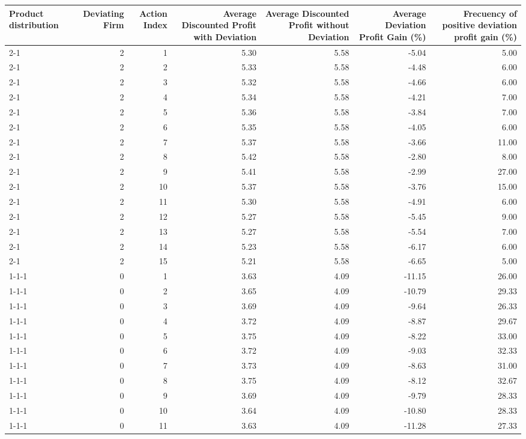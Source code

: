 \begin{tabular}{lrrrrrr}
\toprule
Product distribution & Deviating Firm & Action Index & Average Discounted Profit with Deviation & Average Discounted Profit without Deviation & Average Deviation Profit Gain (\%) & Frecuency of positive deviation profit gain (\%) \\
\midrule
2-1  & 2 & 1 & 5.30 & 5.58 & -5.04 & 5.00 \\
2-1  & 2 & 2 & 5.33 & 5.58 & -4.48 & 6.00 \\
2-1  & 2 & 3 & 5.32 & 5.58 & -4.66 & 6.00 \\
2-1  & 2 & 4 & 5.34 & 5.58 & -4.21 & 7.00 \\
2-1  & 2 & 5 & 5.36 & 5.58 & -3.84 & 7.00 \\
2-1  & 2 & 6 & 5.35 & 5.58 & -4.05 & 6.00 \\
2-1  & 2 & 7 & 5.37 & 5.58 & -3.66 & 11.00 \\
2-1  & 2 & 8 & 5.42 & 5.58 & -2.80 & 8.00 \\
2-1  & 2 & 9 & 5.41 & 5.58 & -2.99 & 27.00 \\
2-1  & 2 & 10 & 5.37 & 5.58 & -3.76 & 15.00 \\
2-1  & 2 & 11 & 5.30 & 5.58 & -4.91 & 6.00 \\
2-1  & 2 & 12 & 5.27 & 5.58 & -5.45 & 9.00 \\
2-1  & 2 & 13 & 5.27 & 5.58 & -5.54 & 7.00 \\
2-1  & 2 & 14 & 5.23 & 5.58 & -6.17 & 6.00 \\
2-1  & 2 & 15 & 5.21 & 5.58 & -6.65 & 5.00 \\
1-1-1 & 0 & 1 & 3.63 & 4.09 & -11.15 & 26.00 \\
1-1-1 & 0 & 2 & 3.65 & 4.09 & -10.79 & 29.33 \\
1-1-1 & 0 & 3 & 3.69 & 4.09 & -9.64 & 26.33 \\
1-1-1 & 0 & 4 & 3.72 & 4.09 & -8.87 & 29.67 \\
1-1-1 & 0 & 5 & 3.75 & 4.09 & -8.22 & 33.00 \\
1-1-1 & 0 & 6 & 3.72 & 4.09 & -9.03 & 32.33 \\
1-1-1 & 0 & 7 & 3.73 & 4.09 & -8.63 & 31.00 \\
1-1-1 & 0 & 8 & 3.75 & 4.09 & -8.12 & 32.67 \\
1-1-1 & 0 & 9 & 3.69 & 4.09 & -9.79 & 28.33 \\
1-1-1 & 0 & 10 & 3.64 & 4.09 & -10.80 & 28.33 \\
1-1-1 & 0 & 11 & 3.63 & 4.09 & -11.28 & 27.33 \\

\end{tabular}
